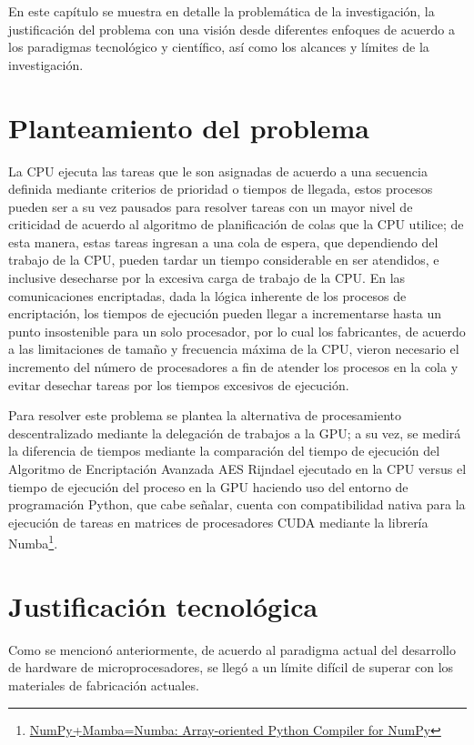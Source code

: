\documentclass[../main/main.tex]{subfiles}
\begin{document}
\espacio

  En este capítulo se muestra en detalle la problemática de la investigación, la justificación del problema con una visión desde diferentes enfoques de acuerdo a los paradigmas tecnológico y científico, así como los alcances y límites de la investigación.

  \section{Planteamiento del problema}

  La CPU ejecuta las tareas que le son asignadas de acuerdo a una secuencia definida mediante criterios de prioridad o tiempos de llegada, estos procesos pueden ser a su vez pausados para resolver tareas con un mayor nivel de criticidad de acuerdo al algoritmo de planificación de colas que la CPU utilice; de esta manera, estas tareas ingresan a una cola de espera, que dependiendo del trabajo de la CPU, pueden tardar un tiempo considerable en ser atendidos, e inclusive desecharse por la excesiva carga de trabajo de la CPU. En las comunicaciones encriptadas, dada la lógica inherente de los procesos de encriptación, los tiempos de ejecución pueden llegar a incrementarse hasta un punto insostenible para un solo procesador, por lo cual los fabricantes, de acuerdo a las limitaciones de tamaño y frecuencia máxima de la CPU, vieron necesario el incremento del número de procesadores a fin de atender los procesos en la cola y evitar desechar tareas por los tiempos excesivos de ejecución.

  Para resolver este problema se plantea la alternativa de procesamiento descentralizado mediante la delegación de trabajos a la GPU; a su vez, se medirá la diferencia de tiempos mediante la comparación del tiempo de ejecución del Algoritmo de Encriptación Avanzada AES Rijndael ejecutado en la CPU versus el tiempo de ejecución del proceso en la GPU haciendo uso del entorno de programación Python, que cabe señalar, cuenta con compatibilidad nativa para la ejecución de tareas en matrices de procesadores CUDA mediante la librería Numba\footnote{\href{http://numba.pydata.org/numba-doc/latest/cuda/index.html}{NumPy+Mamba=Numba: Array-oriented Python Compiler for NumPy}}.

  \section{Justificación tecnológica}

  Como se mencionó anteriormente, de acuerdo al paradigma actual del desarrollo de hardware de microprocesadores, se llegó a un límite difícil de superar con los materiales de fabricación actuales.
\end{document}
